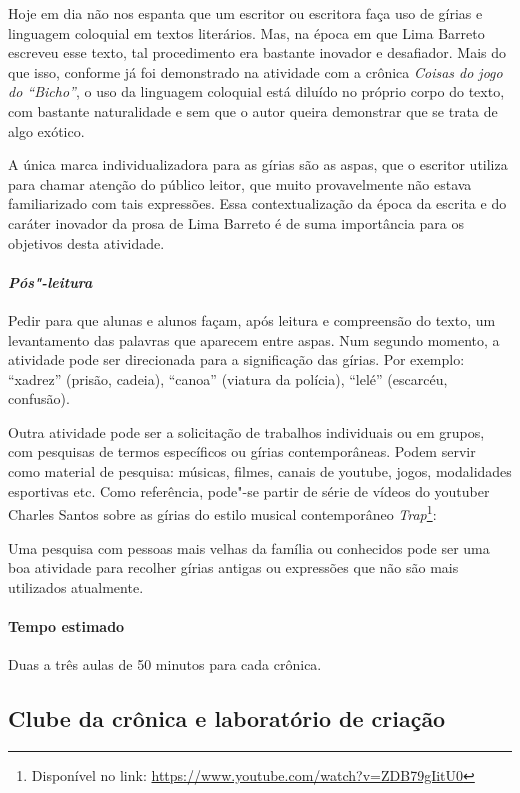 \documentclass[11pt]{extarticle}
\begin{document}
{{Hoje em dia não nos espanta que um escritor ou escritora faça uso de
gírias e linguagem coloquial em textos literários. Mas, na época em que
Lima Barreto escreveu esse texto, tal procedimento era bastante inovador
e desafiador. Mais do que isso, conforme já foi demonstrado na atividade
com a crônica {\textit{Coisas do jogo do ``Bicho''}}, o uso da
linguagem coloquial está diluído no próprio corpo do texto, com bastante
naturalidade e sem que o autor queira demonstrar que se trata de algo
exótico.

A única marca individualizadora para as gírias são as aspas, que o
escritor utiliza para chamar atenção do público leitor, que muito
provavelmente não estava familiarizado com tais expressões. Essa
contextualização da época da escrita e do caráter inovador da prosa de
Lima Barreto é de suma importância para os objetivos desta atividade.

\paragraph{\textit{Pós"-leitura}}

Pedir para que alunas e alunos façam, após leitura e compreensão do
texto, um levantamento das palavras que aparecem entre aspas. Num
segundo momento, a atividade pode ser direcionada para a significação
das gírias. Por exemplo: ``xadrez'' (prisão, cadeia), ``canoa'' (viatura
da polícia), ``lelé'' (escarcéu, confusão).

Outra atividade pode ser a solicitação de trabalhos individuais ou em
grupos, com pesquisas de termos específicos ou gírias contemporâneas.
Podem servir como material de pesquisa: músicas, filmes, canais de
youtube, jogos, modalidades esportivas etc. Como referência, pode"-se
partir de série de vídeos do youtuber Charles Santos sobre as gírias do
estilo musical contemporâneo \emph{Trap}\footnote{Disponível no link:
  \url{https://www.youtube.com/watch?v=ZDB79gIitU0}}:

Uma pesquisa com pessoas mais velhas da família ou conhecidos pode ser
uma boa atividade para recolher gírias antigas ou expressões que não são
mais utilizados atualmente.

\paragraph{Tempo estimado} Duas a três aulas de 50 minutos para cada
crônica.


\subsection{Clube da crônica e laboratório de criação}

}}
\end{document}
